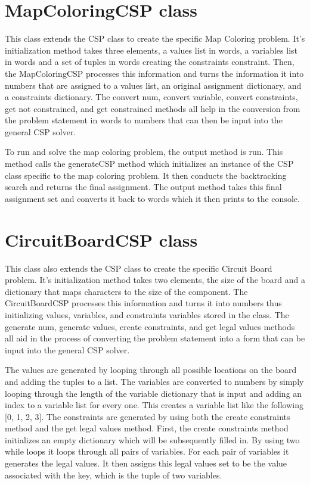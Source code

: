 \documentclass{article}
\begin{document}
\section{MapColoringCSP class}
This class extends the CSP class to create the specific Map Coloring problem. It's initialization method takes three elements, a values list in words, a variables list in words and a set of tuples in words creating the constraints constraint. Then, the MapColoringCSP processes this information and turns the information it into numbers that are assigned to a values list, an original assignment dictionary, and a constraints dictionary. The convert num, convert variable, convert constraints, get not constrained, and get constrained methods all help in the conversion from the problem statement in words to numbers that can then be input into the general CSP solver. 

To run and solve the map coloring problem, the output method is run. This method calls the generateCSP method which initializes an instance of the CSP class specific to the map coloring problem. It then conducts the backtracking search and returns the final assignment. The output method takes this final assignment set and converts it back to words which it then prints to the console.

\section{CircuitBoardCSP class}
This class also extends the CSP class to create the specific Circuit Board problem. It's initialization method takes two elements, the size of the board and a dictionary that maps characters to the size of the component. The CircuitBoardCSP processes this information and turns it into numbers thus initializing values, variables, and constraints variables stored in the class. The generate num, generate values, create constraints, and get legal values methods all aid in the process of converting the problem statement into a form that can be input into the general CSP solver.

The values are generated by looping through all possible locations on the board and adding the tuples to a list. The variables are converted to numbers by simply looping through the length of the variable dictionary that is input and adding an index to a variable list for every one. This creates a variable list like the following [0, 1, 2, 3]. The constraints are generated by using both the create constraints method and the get legal values method. First, the create constraints method initializes an empty dictionary which will be subsequently filled in. By using two while loops it loops through all pairs of variables. For each pair of variables it generates the legal values. It then assigns this legal values set to be the value associated with the key, which is the tuple of two variables.  
\end{document}
